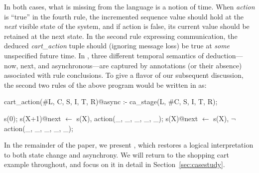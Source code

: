 In both cases, what is missing from the language is a notion of time.  When {\em action} is ``true'' in the fourth rule,
the incremented sequence value should
hold at the {\em next} visible state of the system, and if action is false, its current
value should be retained at the next state.  In the second rule expressing communication, 
the deduced {\em cart\_action}
tuple should (ignoring message loss) be true at {\em some} unspecified future time.  In \lang,
three different temporal semantics of deduction---now, next, and asynchronous---are captured by annotations (or their absence) 
associated with rule conclusions.  To give a flavor of our subsequent discussion, the second two rules of the above program would be written in \lang as:

\begin{Dedalus}
cart_action(#L, C, S, I, T, R)@async :-
  ca_stage(L, #C, S, I, T, R);

s(0);
s(X+1)@next \(\leftarrow\)  s(X), action(_, _, _, _, _);
s(X)@next \(\leftarrow\)  s(X), \(\lnot\) action(_, _, _, _, _);
\end{Dedalus}

In the remainder of the paper, we present \lang, which restores a logical interpretation to
both state change and asynchrony.  We will return to the shopping cart example throughout, and focus on it in detail 
in Section~\ref{sec:casestudy}.

